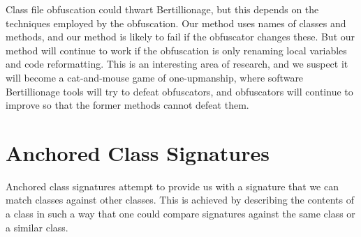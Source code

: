 Class file obfuscation could thwart Bertillionage, but this depends on the
techniques employed by the obfuscation. Our method uses names of
classes and methods, and our method is likely to fail if the
obfuscator changes these. But our method will continue to work if the
obfuscation is only renaming local variables and code reformatting. This is
an interesting area of research, and we suspect it will become a
cat-and-mouse game of one-upmanship, where software Bertillionage tools will try to
defeat obfuscators, and obfuscators will continue to improve so that
the
former methods cannot defeat them.


\section{Anchored Class Signatures}
\label{sec:anchored}


Anchored class signatures attempt to provide us with a signature that
we can match classes against other classes. This is achieved by
describing the contents of a class in such a way that one could
compare signatures against the same class or a similar class.


